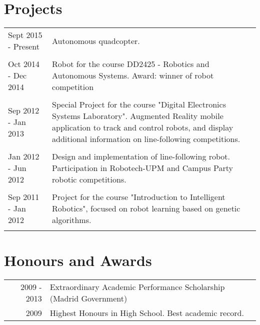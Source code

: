 \documentclass[a4paper,12pt]{article} %
\begin{document}
\section{Projects}
\begin{tabular}{R{4cm}|L{11cm}}
Sept 2015 - Present & Autonomous quadcopter. \\
& \\

Oct 2014 - Dec 2014 & Robot for the course DD2425 - Robotics and Autonomous Systems. Award: winner of robot competition \\
& \\

Sep 2012 - Jan 2013 & Special Project for the course "Digital Electronics Systems Laboratory".  Augmented Reality mobile application to track and control robots, and display additional information on line-following competitions. \\
& \\

Jan 2012 - Jun 2012 & Design and implementation of line-following robot. Participation in Robotech-UPM and Campus Party robotic competitions. \\
& \\

Sep 2011 - Jan 2012 & Project for the course "Introduction to Intelligent Robotics", focused on robot learning based on genetic algorithms. \\
& \\
\end{tabular} 


\section{Honours and Awards}

\begin{tabular}{rl}
2009 - 2013 & Extraordinary Academic Performance Scholarship (Madrid Government)\\

2009 &  Highest Honours in High School. Best academic record. \\
\end{tabular}

\end{document}
